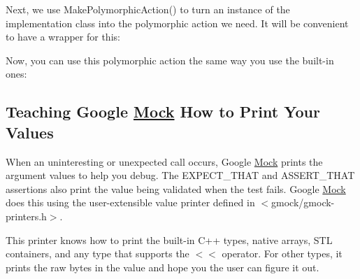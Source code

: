 Next, we use {\ttfamily Make\+Polymorphic\+Action()} to turn an instance of the implementation class into the polymorphic action we need. It will be convenient to have a wrapper for this\+:


\begin{DoxyCode}{0}
\DoxyCodeLine{}
\DoxyCodeLine{\}}
\end{DoxyCode}


Now, you can use this polymorphic action the same way you use the built-\/in ones\+:


\begin{DoxyCode}{0}
\DoxyCodeLine{}
\DoxyCodeLine{\};}
\DoxyCodeLine{}
\end{DoxyCode}


\subsection*{Teaching Google \mbox{\hyperlink{class_mock}{Mock}} How to Print Your Values}

When an uninteresting or unexpected call occurs, Google \mbox{\hyperlink{class_mock}{Mock}} prints the argument values to help you debug. The {\ttfamily E\+X\+P\+E\+C\+T\+\_\+\+T\+H\+AT} and {\ttfamily A\+S\+S\+E\+R\+T\+\_\+\+T\+H\+AT} assertions also print the value being validated when the test fails. Google \mbox{\hyperlink{class_mock}{Mock}} does this using the user-\/extensible value printer defined in {\ttfamily $<$gmock/gmock-\/printers.\+h$>$}.

This printer knows how to print the built-\/in C++ types, native arrays, S\+TL containers, and any type that supports the {\ttfamily $<$$<$} operator. For other types, it prints the raw bytes in the value and hope you the user can figure it out.

